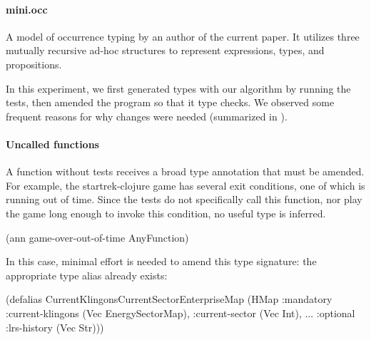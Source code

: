 
\paragraph{mini.occ}
A model of occurrence typing by an author of the
current paper. It utilizes three mutually recursive
ad-hoc structures to represent expressions, types,
and propositions.

In this experiment, we first generated types with our algorithm
by running the tests, then amended the program so that it
type checks.
We observed some frequent reasons for why changes were needed
(summarized in ).

\paragraph{Uncalled functions}
A function without tests receives a broad type annotation that
must be amended.
%
For example, the startrek-clojure game has several exit
conditions, one of which is running out of time.
Since the tests do not specifically call this function,
nor play the game long enough to invoke this condition,
no useful type is inferred.

\begin{cljlisting}
(ann game-over-out-of-time AnyFunction)
\end{cljlisting}

In this case, minimal effort is needed to amend this
type signature: the appropriate type alias
already exists:

\begin{cljlisting}
(defalias CurrentKlingonsCurrentSectorEnterpriseMap
  (HMap :mandatory
    {:current-klingons (Vec EnergySectorMap),
     :current-sector (Vec Int), ...}
    :optional {:lrs-history (Vec Str)}))
\end{cljlisting}

